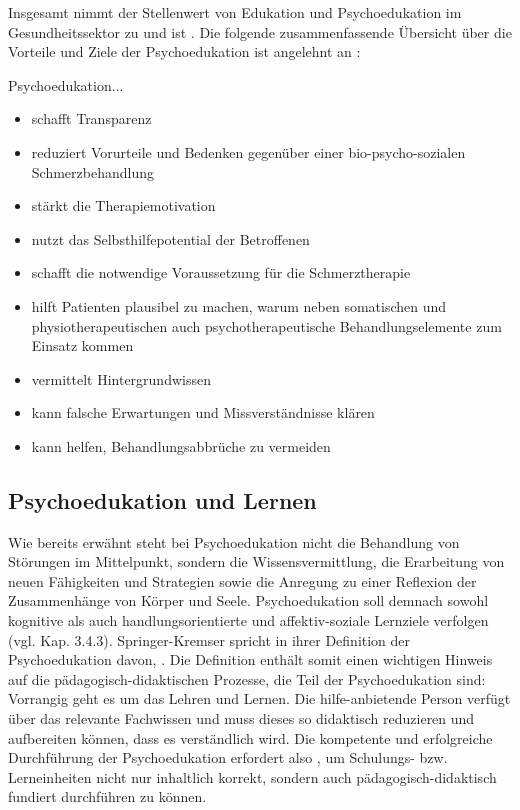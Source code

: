 \documentclass[
  twoside,
  parskip=half-,
  paper=176mm:246mm,
  BCOR=14mm,
  DIV=14,
]{scrreprt}
\begin{document}
Insgesamt nimmt der Stellenwert von Edukation und Psychoedukation im Gesundheitssektor zu und ist . Die folgende zusammenfassende Übersicht über die Vorteile und Ziele der Psychoedukation ist angelehnt an \textcite[7]{wachter}:

Psychoedukation...
\begin{itemize}[nosep, topsep=-10pt]
  \item schafft Transparenz
  \item reduziert Vorurteile und Bedenken gegenüber einer bio-psycho-sozialen Schmerzbehandlung
  \item stärkt die Therapiemotivation
  \item nutzt das Selbsthilfepotential der Betroffenen
  \item schafft die notwendige Voraussetzung für die Schmerztherapie
  \item hilft Patienten plausibel zu machen, warum neben somatischen und physiotherapeutischen auch psychotherapeutische Behandlungselemente zum Einsatz kommen
  \item vermittelt Hintergrundwissen
  \item kann falsche Erwartungen und Missverständnisse klären
  \item kann helfen, Behandlungsabbrüche zu vermeiden
\end{itemize}

\subsection{Psychoedukation und Lernen}
Wie bereits erwähnt steht bei Psychoedukation nicht die Behandlung von Störungen im Mittelpunkt, sondern die Wissensvermittlung, die Erarbeitung von neuen Fähigkeiten und Strategien sowie die Anregung zu einer Reflexion der Zusammenhänge von Körper und Seele. Psychoedukation soll demnach sowohl kognitive als auch handlungsorientierte und affektiv-soziale Lernziele verfolgen (vgl. Kap. 3.4.3). Springer-Kremser spricht in ihrer Definition der Psychoedukation davon, . Die Definition enthält somit einen wichtigen Hinweis auf die pädagogisch-didaktischen Prozesse, die Teil der Psychoedukation sind: Vorrangig geht es um das Lehren und Lernen. Die hilfe-anbietende Person verfügt über das relevante Fachwissen und muss dieses so didaktisch reduzieren und aufbereiten können, dass es verständlich wird. Die kompetente und erfolgreiche Durchführung der Psychoedukation erfordert also , um Schulungs- bzw. Lerneinheiten nicht nur inhaltlich korrekt, sondern auch pädagogisch-didaktisch fundiert durchführen zu können. 
\end{document}
